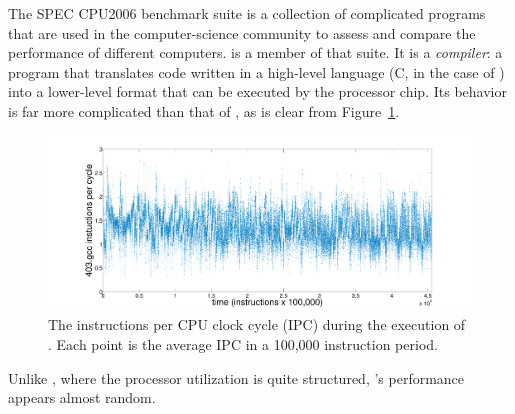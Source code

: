 The SPEC CPU2006 benchmark suite \cite{spec} is a collection of
complicated programs that are used in the computer-science community
to assess and compare the performance of different computers.  \gcc is
a member of that suite.
% 
% 
It is a \emph{compiler}: a program that translates code written in a
high-level language (C, in the case of \gcc) into a lower-level format
that can be executed by the processor chip.  Its behavior is far more
complicated than that of \col, as is clear from
Figure~\ref{fig:gcc-ts}.
  \begin{figure}[t]
  \centering
    \includegraphics[width=\columnwidth]{figs/gccfullts}
    \caption{The instructions per CPU clock cycle (IPC) during the
      execution of \gcc. Each point is the average IPC in a 100,000
      instruction period.}
    \label{fig:gcc-ts}
  \end{figure}
Unlike \col, where the processor utilization is quite structured,
\gcc's performance appears almost random.


